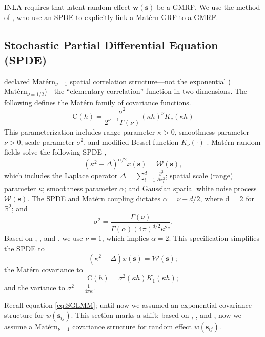 INLA requires that latent random effect $\pmb{w}(\pmb{s})$ be a GMRF. We use the method of \cite{Lindgren2011}, who use an SPDE to explicitly link a Mat\'ern GRF to a GMRF. 

\subsection{Stochastic Partial Differential Equation (SPDE)} \label{SPDE}

\cite{Whittle1954} declared $\text{Mat\'ern}_{\nu = 1}$ spatial correlation structure---not the exponential ($\text{Mat\'ern}_{\nu = 1/2}$)---the ``elementary correlation'' function in two dimensions. The following defines the Mat\'ern family of covariance functions.
$$\text{C}(h) = \frac{\sigma^{2}}{2^{\nu - 1}\Gamma(\nu)}(\kappa h)^{\nu}K_{\nu}(\kappa h)$$
This parameterization includes range parameter $\kappa > 0$, smoothness parameter $\nu > 0$, scale parameter $\sigma^{2}$, and modified Bessel function $K_{\nu}(\cdot)$ \citep{Schabenberger2004}. Mat\'ern random fields solve the following SPDE \citep{Whittle1954},
\begin{equation} \label{eq:spde1}
(\kappa^{2} - \Delta)^{\alpha/2}x(\pmb{s}) = \mathcal{W}(\pmb{s}),
\end{equation}
which includes the Laplace operator $\Delta = \sum_{i=1}^{d} \frac{\partial^{2}}{\partial x_{i}^{2}}$; spatial scale (range) parameter $\kappa$; smoothness parameter $\alpha$; and Gaussian spatial white noise process $\mathcal{W}(\pmb{s})$. The SPDE and Mat\'ern coupling dictates $\alpha = \nu + d/2$, where d = 2 for $\mathbb{R}^{2}$; and $$\sigma^{2} = \frac{\Gamma(\nu)}{\Gamma(\alpha)(4\pi)^{d/2}\kappa^{2\nu}}.$$
Based on \citep{Whittle1954}, \citep{Mondal2017}, and \citep{Lindgren2015}, we use $\nu = 1$, which implies $\alpha = 2$. This specification simplifies the SPDE to 
\begin{equation} \label{eq:spde}
(\kappa^{2} - \Delta)x(\pmb{s}) = \mathcal{W}(\pmb{s});
\end{equation}
the Mat\'ern covariance to 
\begin{equation} \label{eq:Mat\'ern}
\text{C}(h) = \sigma^{2}(\kappa h)K_{1}(\kappa h);
\end{equation}
and the variance to $\sigma^{2} = \frac{1}{4 \pi \kappa}$.

Recall equation \ref{eq:SGLMM}; until now we assumed an exponential covariance structure for $w(\pmb{s}_{ij})$. This section marks a shift: based on \citep{Whittle1954}, \citep{Mondal2017}, and \citep{Lindgren2015}, now we assume a $\text{Mat\'ern}_{\nu = 1}$ covariance structure for random effect $w(\pmb{s}_{ij})$. 

